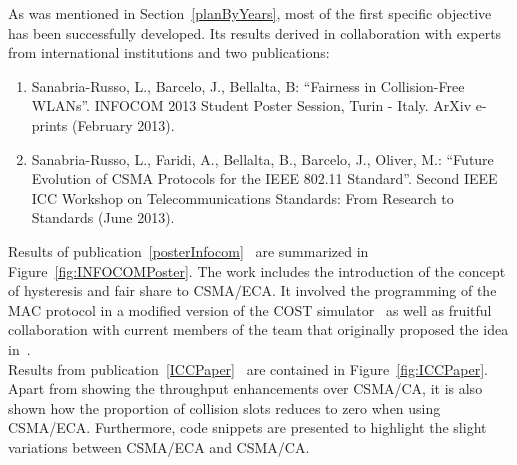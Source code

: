 As was mentioned in Section~\ref{planByYears}, most of the first specific objective has been successfully developed. Its results derived in collaboration with experts from international institutions and two publications:

\begin{enumerate}
	\item Sanabria-Russo, L., Barcelo, J., Bellalta, B: ``Fairness in Collision-Free WLANs''. INFOCOM 2013 Student Poster Session, Turin - Italy. ArXiv e-prints (February 2013).\label{posterInfocom}
	\item Sanabria-Russo, L., Faridi, A., Bellalta, B., Barcelo, J., Oliver, M.: ``Future Evolution of CSMA Protocols for the IEEE 802.11 Standard''. Second IEEE ICC Workshop on Telecommunications Standards: From Research to Standards (June 2013).\label{ICCPaper}
\end{enumerate}

Results of publication~\ref{posterInfocom}~\cite{fairness-ECA} are summarized in Figure~\ref{fig:INFOCOMPoster}. The work includes the introduction of the concept of hysteresis and fair share to CSMA/ECA. It involved the programming of the MAC protocol in a modified version of the COST simulator~\cite{COST} as well as fruitful collaboration with current members of the team that originally proposed the idea in~\cite{L_MAC2}.\\

Results from publication~\ref{ICCPaper}~\cite{research2standards} are contained in Figure~\ref{fig:ICCPaper}. Apart from showing the throughput enhancements over CSMA/CA, it is also shown how the proportion of collision slots reduces to zero when using CSMA/ECA. Furthermore, code snippets are presented to highlight the slight variations between CSMA/ECA and CSMA/CA.


